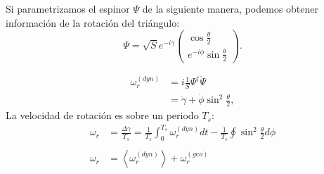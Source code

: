 \documentclass[xcolor=dvipsnames]{beamer}
\begin{document}
\begin{frame}
Si parametrizamos el espinor $\Psi$ de la siguiente manera, podemos obtener información de la rotación del triángulo:
\small
\begin{equation*}
\Psi = \sqrt{S}e^{-i\gamma} \begin{pmatrix}\cos{\frac{\theta}{2}}\\
e^{-i\phi}\sin{\frac{\theta}{2}}\end{pmatrix}.
\end{equation*}

\begin{align*}
\omega_r^{(dyn)} &= i\frac{1}{S}\Psi^\dagger\dot{\Psi} \\
&= \dot{\gamma}+\dot{\phi}\sin^2{\frac{\theta}{2}},
\end{align*}
\normalsize
La velocidad de rotación es sobre un periodo $T_s$:
\small
\begin{align*}
\omega_r &= \frac{\Delta \gamma}{T_s} = \frac{1}{T_s}\int_0^{T_s}\omega_r^{(dyn)}dt -\frac{1}{T_s}\oint\sin^2{\frac{\theta}{2}}d\phi\\
\\
\omega_r &= \left\langle \omega_r^{(dyn)} \right\rangle + \omega_r^{(geo)}\\
\end{align*}
\normalsize


\end{frame}
\end{document}
